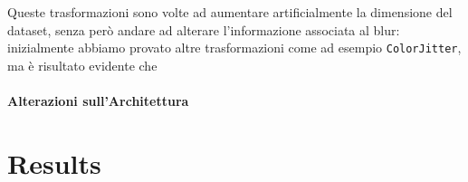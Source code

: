 \documentclass[a4paper,10pt,twocolumn]{article}
\begin{document}
Queste trasformazioni sono volte ad aumentare artificialmente la dimensione del dataset, senza però andare ad alterare l'informazione associata al blur: inizialmente abbiamo provato altre trasformazioni come ad esempio
\texttt{ColorJitter}, ma è risultato evidente che

\paragraph{Alterazioni sull'Architettura}

\section{Results}

\begin{figure}[t]
  \begin{mdframed}[
      linewidth=1pt,
      innertopmargin=6pt,
      innerbottommargin=6pt,
      innerleftmargin=6pt,
      innerrightmargin=6pt
      linecolor=black,
      nobreak
    ]


\end{mdframed}
\end{figure}
\end{document}
